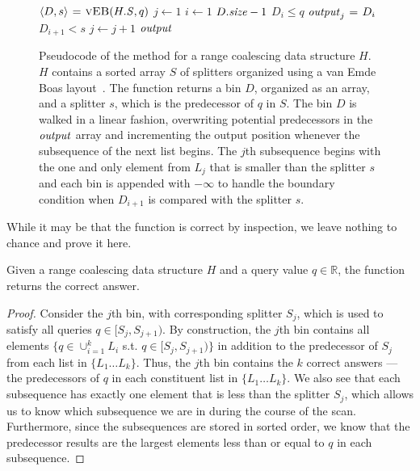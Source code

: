 \begin{figure}[t] 
  \begin{codebox*}
    \li $\langle D, s \rangle \gets \proc{vEB}(\attrib{H}{S},q)$ 
    \li $j \gets 1$
    \li \For $i \gets 1$ \To $\attrib{D}{\id{size}} - 1$ \Do
    \li   \If $D_i \leq q$ \Do
    \li     $\id{output}_j \gets D_i$
          \End
    \li   \If $D_{i+1} < s$ \Do
    \li     $j \gets j + 1$
          \End
        \End
    \li \Return $\id{output}$
  \end{codebox*}
\caption{Pseudocode of the  method for a range coalescing data
structure $H$.  $H$ contains a sorted array $S$ of splitters organized using
a van Emde Boas layout~\cite{BenderDeFa00}.  The function  returns 
a bin $D$, organized as an array, and a splitter $s$, which is the predecessor 
of $q$ in $S$.  The bin $D$ is walked in a linear fashion, overwriting potential
predecessors in the $\id{output}$ array and incrementing the output position whenever
the subsequence of the next list begins.  The $j$th subsequence begins with the
one and only element from $L_j$ that is smaller than the splitter $s$ and each
bin is appended with $-\infty$ to handle the boundary condition when $D_{i+1}$ is
compared with the splitter $s$. }
\label{fig:query} 
\end{figure}

While it may be that the function  is correct by inspection, we leave
nothing to chance and prove it here.

\begin{lemma}
Given a range coalescing data structure
$H$ and a query value $q \in \mathbb{R}$, the function  
returns the correct answer.
\end{lemma}
\begin{proof}
Consider the $j$th bin, with corresponding splitter $S_j$, which is used to satisfy
all queries $q \in [S_j, S_{j+1})$.  By construction, the $j$th bin contains all
elements $\{q \in \cup_{i=1}^{k} L_i$ s.t. $q \in [S_j, S_{j+1}) \}$ in addition to 
the predecessor of $S_j$ from each list in $\{ L_1 \ldots L_k \}$.  
Thus, the $j$th bin contains the $k$ correct
answers --- the predecessors of $q$ in each constituent list in $\{ L_1 \ldots L_k \}$.  
We also see that each subsequence has exactly one element that is less
than the splitter $S_j$, which allows us to know which subsequence we are in during
the course of the scan.  Furthermore, since the subsequences are stored in sorted
order, we know that the predecessor results are the largest elements less than or
equal to $q$ in each subsequence.
\end{proof}

